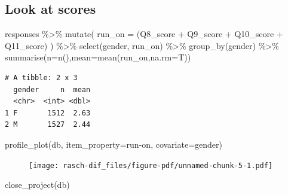 \documentclass[
  letterpaper,
  DIV=11,
  numbers=noendperiod]{scrreprt}
\newenvironment{Shaded}{\begin{snugshade}}{\end{snugshade}}
\newcommand{\AttributeTok}[1]{\textcolor[rgb]{0.40,0.45,0.13}{#1}}
\newcommand{\FunctionTok}[1]{\textcolor[rgb]{0.28,0.35,0.67}{#1}}
\newcommand{\NormalTok}[1]{\textcolor[rgb]{0.00,0.23,0.31}{#1}}
\newcommand{\SpecialCharTok}[1]{\textcolor[rgb]{0.37,0.37,0.37}{#1}}
\newcommand{\StringTok}[1]{\textcolor[rgb]{0.13,0.47,0.30}{#1}}
\begin{document}
\hypertarget{look-at-scores}{%
\subsection{Look at scores}\label{look-at-scores}}

\begin{Shaded}
\begin{Highlighting}[]
\NormalTok{responses }\SpecialCharTok{\%\textgreater{}\%} \FunctionTok{mutate}\NormalTok{(}
    \AttributeTok{run\_on =}\NormalTok{ (Q8\_score }\SpecialCharTok{+}\NormalTok{ Q9\_score }\SpecialCharTok{+}\NormalTok{ Q10\_score }\SpecialCharTok{+}\NormalTok{ Q11\_score)}
\NormalTok{) }\SpecialCharTok{\%\textgreater{}\%} \FunctionTok{select}\NormalTok{(gender, run\_on) }\SpecialCharTok{\%\textgreater{}\%} \FunctionTok{group\_by}\NormalTok{(gender) }\SpecialCharTok{\%\textgreater{}\%} \FunctionTok{summarise}\NormalTok{(}\AttributeTok{n=}\FunctionTok{n}\NormalTok{(),}\AttributeTok{mean=}\FunctionTok{mean}\NormalTok{(run\_on,}\AttributeTok{na.rm=}\NormalTok{T))}
\end{Highlighting}
\end{Shaded}

\begin{verbatim}
# A tibble: 2 x 3
  gender     n  mean
  <chr>  <int> <dbl>
1 F       1512  2.63
2 M       1527  2.44
\end{verbatim}

\begin{Shaded}
\begin{Highlighting}[]
\FunctionTok{profile\_plot}\NormalTok{(db, }\AttributeTok{item\_property=}\StringTok{\textquotesingle{}run{-}on\textquotesingle{}}\NormalTok{, }\AttributeTok{covariate=}\StringTok{\textquotesingle{}gender\textquotesingle{}}\NormalTok{)}
\end{Highlighting}
\end{Shaded}

\begin{figure}[H]

{\centering \texttt{[image: rasch-dif\_files/figure-pdf/unnamed-chunk-5-1.pdf]}

}

\end{figure}

\begin{Shaded}
\begin{Highlighting}[]
\FunctionTok{close\_project}\NormalTok{(db)}
\end{Highlighting}
\end{Shaded}
\end{document}
